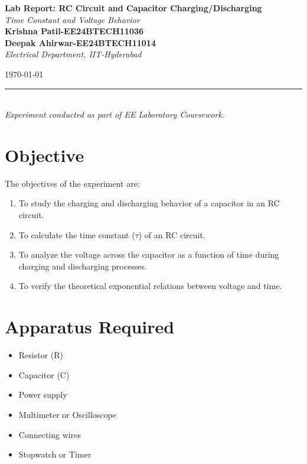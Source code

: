 \documentclass[a4paper,12pt]{article}
\newcommand{\myheader}{
    \noindent\rule{\textwidth}{1pt}\\[0.4cm]
}
\begin{document}
\begin{titlepage}
    \centering
    
    \vspace*{2cm}
    
    {\Huge \bfseries \textcolor{myblue}{Lab Report: RC Circuit and Capacitor Charging/Discharging}}\\[0.5cm]
    {\LARGE \textit{\textcolor{myred}{Time Constant and Voltage Behavior}}}\\[1.5cm]
    
    \noindent
    \textbf{\Huge Krishna Patil-EE24BTECH11036}\\[0.3cm]
    \textbf{\Huge Deepak Ahirwar-EE24BTECH11014}\\[1.5cm]
    
    {\LARGE \textit{Electrical Department, IIT-Hyderabad}}\\[2cm]
    
    \vfill
    
    {\LARGE \today}
    
    \vfill
    \myheader
    \centering
    \textcolor{mygold}{\Large \textit{Experiment conducted as part of EE Laboratory Coursework.}}
    
\end{titlepage}

\newpage

\section*{\color{myblue}Objective}
The objectives of the experiment are:
\begin{enumerate}
    \item To study the charging and discharging behavior of a capacitor in an RC circuit.
    \item To calculate the time constant ($\tau$) of an RC circuit.
    \item To analyze the voltage across the capacitor as a function of time during charging and discharging processes.
    \item To verify the theoretical exponential relations between voltage and time.
\end{enumerate}

\section*{\color{myblue}Apparatus Required}
\begin{itemize}
    \item Resistor (R)
    \item Capacitor (C)
    \item Power supply
    \item Multimeter or Oscilloscope
    \item Connecting wires
    \item Stopwatch or Timer
\end{itemize}
\end{document}
